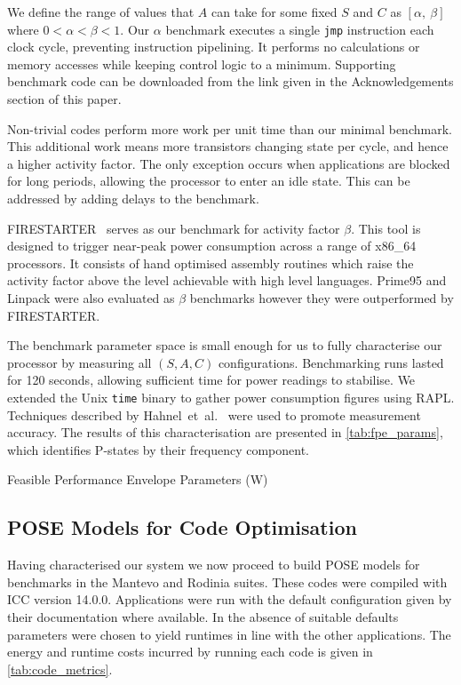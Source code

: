 We define the range of values that $A$ can take for some fixed $S$ and $C$ as $[\alpha,~\beta]$ where $0 < \alpha < \beta < 1$.
Our $\alpha$ benchmark executes a single \texttt{jmp} instruction each clock cycle, preventing instruction pipelining.
It performs no calculations or memory accesses while keeping control logic to a minimum.
Supporting benchmark code can be downloaded from the link given in the Acknowledgements section of this paper.

Non-trivial codes perform more work per unit time than our minimal benchmark.
This additional work means more transistors changing state per cycle, and hence a higher activity factor.
The only exception occurs when applications are blocked for long periods, allowing the processor to enter an idle state.
This can be addressed by adding delays to the benchmark.

FIRESTARTER~\cite{hackenberg:2013ab} serves as our benchmark for activity factor $\beta$.
This tool is designed to trigger near-peak power consumption across a range of x86\_64 processors.
It consists of hand optimised assembly routines which raise the activity factor above the level achievable with high level languages.
Prime95 and Linpack were also evaluated as $\beta$ benchmarks however they were outperformed by FIRESTARTER.

The benchmark parameter space is small enough for us to fully characterise our processor by measuring all $(S,A,C)$ configurations.
Benchmarking runs lasted for 120 seconds, allowing sufficient time for power readings to stabilise.
We extended the Unix \texttt{time} binary to gather power consumption figures using RAPL.
Techniques described by Hahnel~et~al.~\cite{hahnel:2012aa} were used to promote measurement accuracy.
The results of this characterisation are presented in \autoref{tab:fpe_params}, which identifies P-states by their frequency component.

\begin{table}
  \scriptsize
  \centering
  \caption{Feasible Performance Envelope Parameters (W)}
  \label{tab:fpe_params}
  
\end{table}

\subsection{POSE Models for Code Optimisation}
\noindent
Having characterised our system we now proceed to build POSE models for benchmarks in the Mantevo and Rodinia suites.
These codes were compiled with ICC version 14.0.0.
Applications were run with the default configuration given by their documentation where available.
In the absence of suitable defaults parameters were chosen to yield runtimes in line with the other applications.
The energy and runtime costs incurred by running each code is given in \autoref{tab:code_metrics}.

